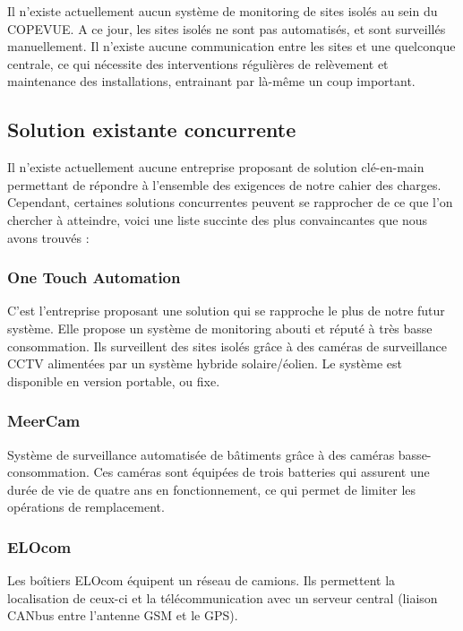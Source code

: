 Il n’existe actuellement aucun système de monitoring de sites isolés au sein du COPEVUE. A ce jour, les sites isolés ne sont pas automatisés, et sont surveillés manuellement. Il n’existe aucune communication entre les sites et une quelconque centrale, ce qui nécessite des interventions régulières de relèvement et maintenance des installations, entrainant par là-même un coup important.

\subsection{Solution existante concurrente}

Il n’existe actuellement aucune entreprise proposant de solution clé-en-main permettant de répondre à l'ensemble des exigences de notre cahier des charges. Cependant, certaines solutions concurrentes peuvent se rapprocher de ce que l'on chercher à atteindre, voici une liste succinte des plus convaincantes que nous avons trouvés :

\subsubsection{One Touch Automation}

C’est l’entreprise proposant une solution qui se rapproche le plus de notre futur système.
Elle propose un système de monitoring abouti et réputé à très basse consommation. Ils surveillent des sites isolés grâce à des caméras de surveillance CCTV alimentées par un système hybride solaire/éolien. Le système est disponible en version portable, ou fixe.

\subsubsection{MeerCam}

Système de surveillance automatisée de bâtiments grâce à des caméras basse-consommation. Ces caméras sont équipées de trois batteries qui assurent une durée de vie de quatre ans en fonctionnement, ce qui permet de limiter les opérations de remplacement.

\subsubsection{ELOcom}

Les boîtiers ELOcom équipent un réseau de camions. Ils permettent la localisation de ceux-ci et la télécommunication avec un serveur central (liaison CANbus entre l’antenne GSM et le GPS).

